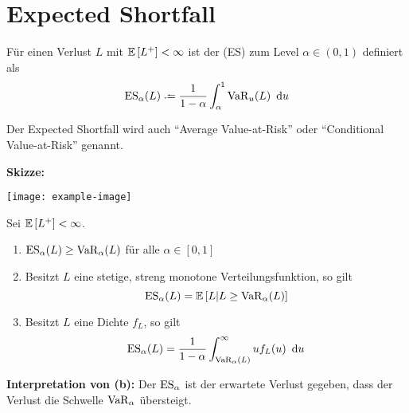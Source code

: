 \section{Expected Shortfall}
\begin{*definition}
	Für einen Verlust $L$ mit $\mathbb{E} \left[ L^+ \right] < \infty$ ist der  (ES) zum Level $\alpha \in (0,1)$ definiert als
	\begin{equation*}
	\ES_\alpha(L) \defeq \frac{1}{1-\alpha} \int_\alpha^1 \VaR_u(L) \diffskip{u}
	\end{equation*}
\end{*definition}

\begin{*bemerkung}
	Der Expected Shortfall wird auch \enquote{Average Value-at-Risk} oder \enquote{Conditional Value-at-Risk} genannt.
\end{*bemerkung}

\textbf{Skizze:}
\begin{center}
	\texttt{[image: example-image]}
\end{center}

\begin{theorem}
	Sei $\mathbb{E} \left[ L^+ \right] < \infty$.
	\begin{enumerate}[label=(\alph*), nolistsep]
		\item $\operatorname{ES}_\alpha(L) \ge \operatorname{VaR}_\alpha(L)$ für alle $\alpha \in [0,1]$
		\item Besitzt $L$ eine stetige, streng monotone Verteilungsfunktion, so gilt
		\begin{equation*}
			\operatorname{ES}_\alpha(L) = \mathbb{E} \left[ L | L \ge \operatorname{VaR}_\alpha(L) \right]
		\end{equation*}
		\item Besitzt $L$ eine Dichte $f_L$, so gilt
		\begin{equation*}
			\operatorname{ES}_\alpha(L) = \frac{1}{1-\alpha} \int_{\operatorname{VaR}_\alpha(L)}^\infty u f_L(u) \enskip \mathrm{d}u
		\end{equation*}
	\end{enumerate}
\end{theorem}

\textbf{Interpretation von (b):} Der $\operatorname{ES}_\alpha$ ist der erwartete Verlust gegeben, dass der Verlust die Schwelle $\operatorname{VaR}_\alpha$ übersteigt.

